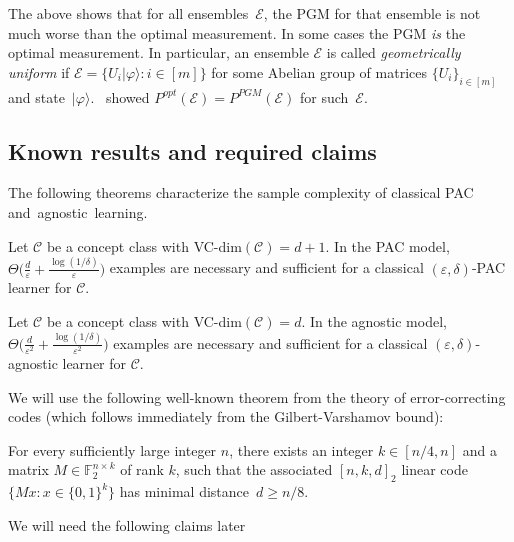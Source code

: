 \documentclass[twoside,11pt]{article}
\newcommand{\eps}{\varepsilon}
\newcommand{\ket}[1]{|#1\rangle}
\newcommand{\E}{\mathcal{E}}
\newcommand{\ph}{\ensuremath{\varphi}}
\def\01{\{0,1\}}
\newcommand{\C}{\ensuremath{\mathscr{C}}}
\begin{document}
The above shows that for all ensembles~$\E$, the PGM for that ensemble is not much worse than the optimal measurement. In some cases the PGM \emph{is} the optimal measurement.  In particular, an ensemble $\E$ is called \emph{geometrically uniform} if $\E=\{U_i\ket{\ph}:i\in [m]\}$ for some Abelian group of matrices $\{U_i\}_{i\in [m]}$ and state~$\ket{\ph}$.~\cite{eldar&forney:squarerootmeasurement} showed $P^{opt}(\E)=P^{PGM}(\E)$ for such~$\E$.
\subsection{Known results and required claims}
The following theorems characterize the sample complexity of classical PAC and~agnostic~learning.

\begin{theorem} 
	\label{thm:classicalpaclearning}
	Let $\C$ be a concept class with VC-dim$(\C)=d+1$.
	In the PAC model, $\Theta\Big(\frac{d}{\eps} + \frac{\log(1/\delta)}{\eps}\Big) $ examples are necessary and sufficient for a classical $(\eps,\delta)$-PAC learner for $\C$.
\end{theorem}

\begin{theorem} 
	\label{thm:classicalagnosticlearning}
	Let $\C$ be a concept class with VC-dim$(\C)=d$.
	In the agnostic model, $\Theta\Big(\frac{d}{\eps^2} + \frac{\log(1/\delta)}{\eps^2}\Big) $ examples are necessary and sufficient for a classical $(\eps,\delta)$-agnostic learner for $\C$.
\end{theorem}

We will use the following well-known theorem from the theory of error-correcting codes (which follows immediately from the Gilbert-Varshamov bound): 
\begin{theorem}
	\label{thm:randomlinearcode}
	For every sufficiently large integer $n$, there exists an integer $k\in[n/4,n]$ and a matrix $M\in\mathbb{F}_2^{n\times k}$ of rank $k$, such that the associated $[n,k,d]_2$ linear code $\{Mx:x\in\01^k\}$ has minimal distance~$d\geq n/8$.
\end{theorem}

We will need the following claims later
\end{document}
